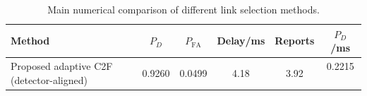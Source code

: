 \begin{table}[t]
    \centering
    \caption{Main numerical comparison of different link selection methods.}
    \label{tab:main_summary}
    \begin{tabular}{l c c c c c}
        \hline
        Method & $P_D$ & $P_{\mathrm{FA}}$ & Delay/ms & Reports & $P_D$/ms \\
        \hline
        Proposed adaptive C2F (detector-aligned) & 0.9260 & 0.0499 & 4.18 & 3.92 & 0.2215 \
        \hline
    \end{tabular}
\end{table}
